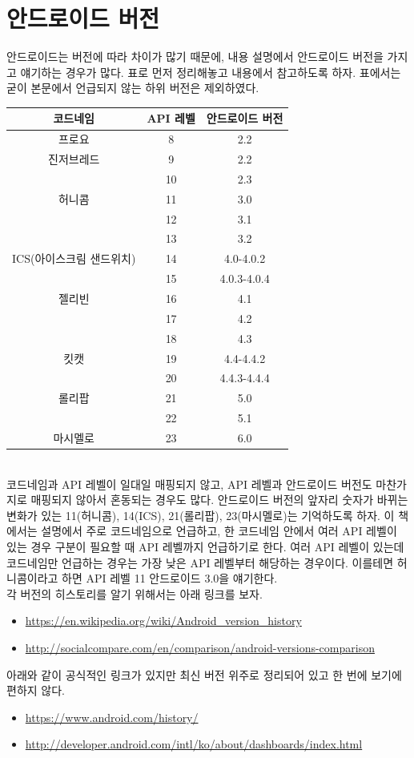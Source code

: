 \section{안드로이드 버전}
안드로이드는 버전에 따라 차이가 많기 때문에, 내용 설명에서 안드로이드 버전을 가지고 얘기하는 경우가 많다. 
표로 먼저 정리해놓고 내용에서 참고하도록 하자. 표에서는 굳이 본문에서 언급되지 않는 하위 버전은 제외하였다.\\

\begin{tabular}{|c|c|c|}\hline
코드네임 & API 레벨 & 안드로이드 버전 \\ \hline
프로요 & 8 & 2.2 \\ \hline
진저브레드 & 9 & 2.2\\ \cline{2-3}
 & 10 & 2.3\\ \hline
허니콤 & 11 & 3.0\\ \cline{2-3}
 & 12 & 3.1\\ \cline{2-3}
 & 13 & 3.2\\ \hline
ICS(아이스크림 샌드위치) & 14 & 4.0-4.0.2\\ \cline{2-3}
 & 15 & 4.0.3-4.0.4\\ \hline 
젤리빈 & 16 & 4.1\\ \cline{2-3}
 & 17 & 4.2\\ \cline{2-3}
 & 18 & 4.3\\ \hline
킷캣 & 19 & 4.4-4.4.2\\ \cline{2-3}
 & 20 & 4.4.3-4.4.4\\ \hline  
롤리팝 & 21 & 5.0\\ \cline{2-3}
 & 22 & 5.1\\ \hline 
마시멜로 & 23 & 6.0\\ \hline 
\end{tabular}\\

코드네임과 API 레벨이 일대일 매핑되지 않고, API 레벨과 안드로이드 버전도 마찬가지로 매핑되지 않아서 혼동되는 경우도 많다. 안드로이드 버전의 앞자리 숫자가 바뀌는 변화가 있는 11(허니콤), 14(ICS), 21(롤리팝), 23(마시멜로)는 기억하도록 하자.
이 책에서는 설명에서 주로 코드네임으로 언급하고, 한 코드네임 안에서 여러 API 레벨이 있는 경우 구분이 필요할 때 API 레벨까지 언급하기로 한다. 
여러 API 레벨이 있는데 코드네임만 언급하는 경우는 가장 낮은 API 레벨부터 해당하는 경우이다. 이를테면 허니콤이라고 하면 API 레벨 11 안드로이드 3.0을 얘기한다.\\

각 버전의 히스토리를 알기 위해서는 아래 링크를 보자.
\begin{itemize}
\item \url{https://en.wikipedia.org/wiki/Android_version_history}
\item \url{http://socialcompare.com/en/comparison/android-versions-comparison}
\end{itemize}
아래와 같이 공식적인 링크가 있지만 최신 버전 위주로 정리되어 있고 한 번에 보기에 편하지 않다.
\begin{itemize}
\item \url{https://www.android.com/history/}
\item \url{http://developer.android.com/intl/ko/about/dashboards/index.html}
\end{itemize}

